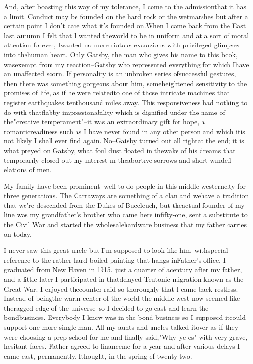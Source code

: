 \documentclass[12pt,a4paper]{report}
\begin{document}
\FloatBarrier

And, after boasting this way of my tolerance, I come to the admissionthat it has a limit. Conduct may be founded on the hard rock or the wetmarshes but after a certain point I don't care what it's founded on.When I came back from the East last autumn I felt that I wanted theworld to be in uniform and at a sort of moral attention forever; Iwanted no more riotous excursions with privileged glimpses into thehuman heart. Only Gatsby, the man who gives his name to this book, wasexempt from my reaction--Gatsby who represented everything for which Ihave an unaffected scorn. If personality is an unbroken series ofsuccessful gestures, then there was something gorgeous about him, someheightened sensitivity to the promises of life, as if he were relatedto one of those intricate machines that register earthquakes tenthousand miles away. This responsiveness had nothing to do with thatflabby impressionability which is dignified under the name of the"creative temperament"--it was an extraordinary gift for hope, a romanticreadiness such as I have never found in any other person and which itis not likely I shall ever find again. No--Gatsby turned out all rightat the end; it is what preyed on Gatsby, what foul dust floated in thewake of his dreams that temporarily closed out my interest in theabortive sorrows and short-winded elations of men.

My family have been prominent, well-to-do people in this middle-westerncity for three generations. The Carraways are something of a clan and wehave a tradition that we're descended from the Dukes of Buccleuch, but theactual founder of my line was my grandfather's brother who came here infifty-one, sent a substitute to the Civil War and started the wholesalehardware business that my father carries on today.

I never saw this great-uncle but I'm supposed to look like him--withspecial reference to the rather hard-boiled painting that hangs inFather's office. I graduated from New Haven in 1915, just a quarter of acentury after my father, and a little later I participated in thatdelayed Teutonic migration known as the Great War. I enjoyed thecounter-raid so thoroughly that I came back restless. Instead of beingthe warm center of the world the middle-west now seemed like theragged edge of the universe--so I decided to go east and learn the bondbusiness. Everybody I knew was in the bond business so I supposed itcould support one more single man. All my aunts and uncles talked itover as if they were choosing a prep-school for me and finally said,"Why--ye-es" with very grave, hesitant faces. Father agreed to financeme for a year and after various delays I came east, permanently, Ithought, in the spring of twenty-two.
\end{document}
